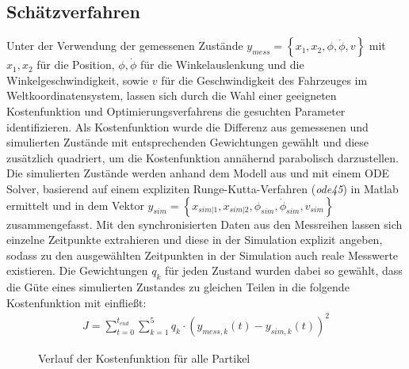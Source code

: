 \subsection{Schätzverfahren}
Unter der Verwendung der gemessenen Zustände $y_{mess} = \left \{x_1, x_2, \phi, \dot{\phi}, v  \right \}$ mit $x_1, x_2$ für die Position, $\phi, \dot{\phi}$ für die Winkelauslenkung und die Winkelgeschwindigkeit, sowie $v$ für die Geschwindigkeit des Fahrzeuges im Weltkoordinatensystem, lassen sich durch die Wahl einer geeigneten Kostenfunktion und Optimierungsverfahrens die gesuchten Parameter identifizieren. Als Kostenfunktion wurde die Differenz aus gemessenen und simulierten Zustände mit entsprechenden Gewichtungen gewählt und diese zusätzlich quadriert, um die Kostenfunktion annähernd parabolisch darzustellen. Die simulierten Zustände werden anhand dem Modell aus \cite{VikAnd} und mit einem ODE Solver, basierend auf einem expliziten Runge-Kutta-Verfahren (\textit{ode45}) in Matlab ermittelt und in dem Vektor $y_{sim} = \left \{x_{sim|1}, x_{sim|2}, \phi_{sim}, \dot{\phi}_{sim}, v_{sim}  \right \}$ zusammengefasst. Mit den synchronisierten Daten aus den Messreihen lassen sich einzelne Zeitpunkte extrahieren und diese in der Simulation explizit angeben, sodass zu den ausgewählten Zeitpunkten in der Simulation auch reale Messwerte existieren. Die Gewichtungen $q_k$ für jeden Zustand wurden dabei so gewählt, dass die Güte eines simulierten Zustandes zu gleichen Teilen in die folgende Kostenfunktion mit einfließt:
\begin{align*}
J = \sum_{t=0}^{t_{end}}\sum_{k = 1}^{5} q_k\cdot  \left (y_{mess, k}\left ( t \right ) - y_{sim, k}\left ( t \right )  \right )^2
\end{align*}
\begin{figure} 
 \GenerationLokal
\centering
{}
\caption{Verlauf der Kostenfunktion für alle Partikel}
\label{pict:PSOallePart}
\end{figure}
